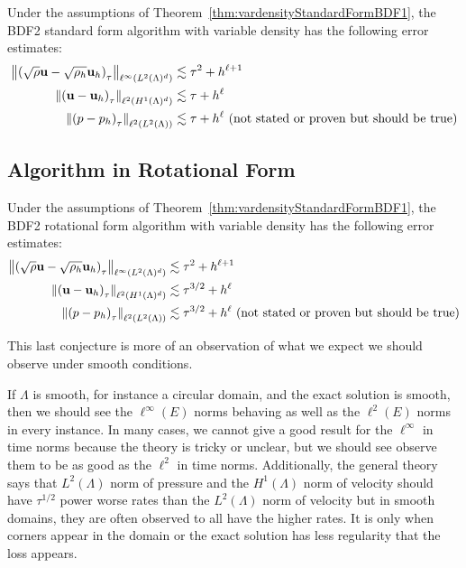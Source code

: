 \documentclass[letterpaper]{erdc}
\begin{document}
\begin{conjecture}
  Under the assumptions of Theorem~\ref{thm:vardensityStandardFormBDF1}, the BDF2 standard form algorithm with variable density has the following error estimates:
  \begin{align}
    \left\| \left(\sqrt{\rho} \textbf{u} - \sqrt{\rho_h} \textbf{u}_h \right)_{\tau} \right\|_{\ell^{\infty}(L^2(\Lambda)^d)} &\lesssim \tau^2 + h^{\ell+1}\\
    \left\| \left(\textbf{u} - \textbf{u}_h \right)_{\tau} \right\|_{\ell^2(H^1(\Lambda)^d)} &\lesssim \tau + h^{\ell}\\
    \left\|\left(p - p_h\right)_{\tau} \right\|_{\ell^{2}(L^2(\Lambda))} &\lesssim \tau + h^{\ell}  \mbox{  (not stated or proven but should be true)}
  \end{align}
\end{conjecture}

%
%
\subsection{Algorithm in Rotational Form}

\begin{conjecture}
  Under the assumptions of Theorem~\ref{thm:vardensityStandardFormBDF1}, the BDF2 rotational form algorithm with variable density has the following error estimates:
  \begin{align}
    \left\| \left(\sqrt{\rho} \textbf{u} - \sqrt{\rho_h} \textbf{u}_h \right)_{\tau} \right\|_{\ell^{\infty}(L^2(\Lambda)^d)} &\lesssim \tau^2 + h^{\ell+1}\\
    \left\| \left( \textbf{u} - \textbf{u}_h \right)_{\tau} \right\|_{\ell^2(H^1(\Lambda)^d)} &\lesssim \tau^{3/2} + h^{\ell}\\
    \left\|\left(p - p_h\right)_{\tau} \right\|_{\ell^{2}(L^2(\Lambda))} &\lesssim \tau^{3/2} + h^{\ell}  \mbox{  (not stated or proven but should be true)}
  \end{align}
\end{conjecture}

This last conjecture is more of an observation of what we expect we should observe under smooth conditions.  
\begin{conjecture}
  If $\Lambda$ is smooth, for instance a circular domain, and the exact solution is smooth, then we should see the $\ell^{\infty}(E)$ norms behaving as well as the $\ell^{2}(E)$ norms in every instance.  In many cases, we cannot give a good result for the $\ell^{\infty}$ in time norms because the theory is tricky or unclear, but we should see observe them to be as good as the $\ell^2$ in time norms.  Additionally, the general theory says that $L^{2}(\Lambda)$ norm of pressure and the $H^1(\Lambda)$ norm of velocity should have $\tau^{1/2}$ power worse rates than the $L^2(\Lambda)$ norm of velocity but in smooth domains, they are often observed to all have the higher rates.  It is only when corners appear in the domain or the exact solution has less regularity that the loss appears.  
\end{conjecture}
\end{document}
